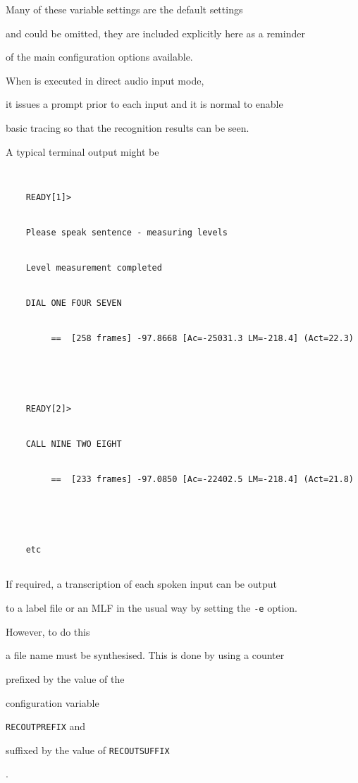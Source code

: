Many of these variable settings are the default settings


and could be omitted, they are included explicitly here as a reminder


of the main configuration options available.





When  is executed in direct audio input mode,


it issues a prompt prior to each input and it is normal to enable


basic tracing so that the recognition results can be seen.


A typical terminal output might be


\begin{verbatim}


    READY[1]>


    Please speak sentence - measuring levels


    Level measurement completed


    DIAL ONE FOUR SEVEN  


         ==  [258 frames] -97.8668 [Ac=-25031.3 LM=-218.4] (Act=22.3)





    READY[2]>


    CALL NINE TWO EIGHT  


         ==  [233 frames] -97.0850 [Ac=-22402.5 LM=-218.4] (Act=21.8)





    etc


\end{verbatim}


If required, a transcription of each spoken input can be output 


to a label file or an MLF in the usual way by setting the \texttt{-e} option.  


However, to do this


a file name must be synthesised.  This is done by using a counter


prefixed by the value of the


 configuration variable


\texttt{RECOUTPREFIX} and 


suffixed by the value of \texttt{RECOUTSUFFIX}


.


